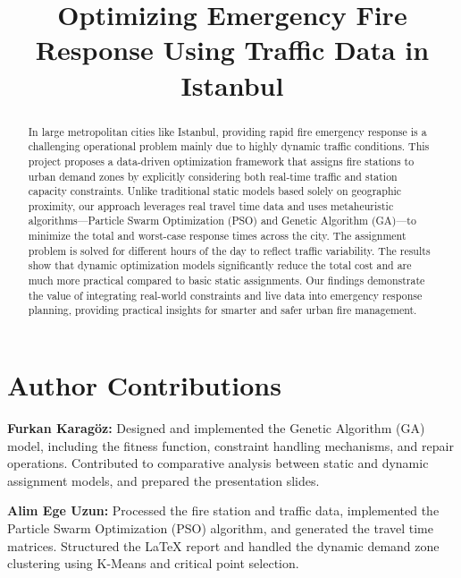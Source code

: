 \documentclass[conference]{IEEEtran}
\begin{document}
\title{Optimizing Emergency Fire Response Using Traffic Data in Istanbul}

\author{
\and
{}
}

\maketitle

\vspace{1em}
\section*{\textbf{Author Contributions}}

\textbf{Furkan Karagöz:} Designed and implemented the Genetic Algorithm (GA) model, including the fitness function, constraint handling mechanisms, and repair operations. Contributed to comparative analysis between static and dynamic assignment models, and prepared the presentation slides.

\textbf{Alim Ege Uzun:} Processed the fire station and traffic data, implemented the Particle Swarm Optimization (PSO) algorithm, and generated the travel time matrices. Structured the LaTeX report and handled the dynamic demand zone clustering using K-Means and critical point selection.

\vspace{1.5em}





\begin{abstract}
In large metropolitan cities like Istanbul, providing rapid fire emergency response is a challenging operational problem mainly due to highly dynamic traffic conditions. This project proposes a data-driven optimization framework that assigns fire stations to urban demand zones by explicitly considering both real-time traffic and station capacity constraints. Unlike traditional static models based solely on geographic proximity, our approach leverages real travel time data and uses metaheuristic algorithms—Particle Swarm Optimization (PSO) and Genetic Algorithm (GA)—to minimize the total and worst-case response times across the city. The assignment problem is solved for different hours of the day to reflect traffic variability. The results show that dynamic optimization models significantly reduce the total cost and are much more practical compared to basic static assignments. Our findings demonstrate the value of integrating real-world constraints and live data into emergency response planning, providing practical insights for smarter and safer urban fire management.
\end{abstract}
\end{document}
